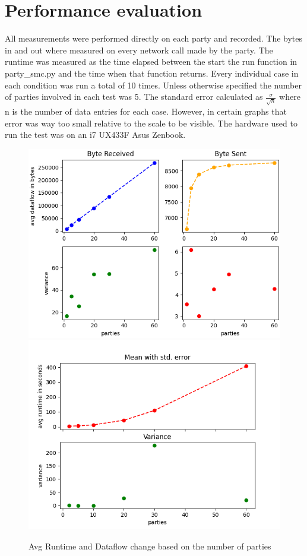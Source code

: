 \documentclass[10pt,conference,compsocconf]{IEEEtran}
\begin{document}
\section{Performance evaluation}
All measurements were performed directly on each party and recorded.
The bytes in and out where measured on every
network call made by the party.
The runtime was measured as the time elapsed between the start the run function in
party\_smc.py and the time when that function returns.
Every individual case in each condition was run a total of 10 times.
Unless otherwise specified the number of parties involved in each test was 5.
The standard error calculated as $\frac{\sigma}{\sqrt{n}}$ where n is the number of data entries for each case.
However, in certain graphs that error was way too small relative to the scale to be visible.
The hardware used to run the test was on an i7 UX433F Asus Zenbook.



\begin{figure}[ht]
    \includegraphics[width=0.49\linewidth]{../performance_analysis/dataflow_num_party_change.png}
    \includegraphics[width=0.49\linewidth]{../performance_analysis/runtime_num_party_change.png}
    \caption{Avg Runtime and Dataflow change based on the number of parties}
    \label{fig:num_parties}
\end{figure}
\end{document}
